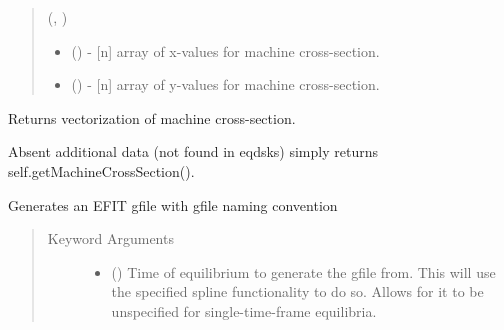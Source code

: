 \documentclass[letterpaper,10pt,english]{sphinxmanual}
\begin{document}
\begin{fulllineitems}
\begin{fulllineitems}
\begin{quote}
\begin{description}
(, )
\begin{itemize}
\item {} 
 () - {[}n{]} array of x-values for machine cross-section.

\item {} 
 () - {[}n{]} array of y-values for machine cross-section.

\end{itemize}


\end{description}\end{quote}

\end{fulllineitems}


\begin{fulllineitems}
\label{\detokenize{eqtools:eqtools.eqdskreader.EqdskReader.getMachineCrossSectionFull}}
Returns vectorization of machine cross-section.

Absent additional data (not found in eqdsks) simply returns
self.getMachineCrossSection().

\end{fulllineitems}


\begin{fulllineitems}
\label{\detokenize{eqtools:eqtools.eqdskreader.EqdskReader.gfile}}
Generates an EFIT gfile with gfile naming convention
\begin{quote}\begin{description}
\item[{Keyword Arguments}] \leavevmode\begin{itemize}
\item {} 
 () \textendash{} Time of equilibrium to
generate the gfile from. This will use the specified
spline functionality to do so. Allows for it to be
unspecified for single-time-frame equilibria.


\end{itemize}
\end{description}
\end{quote}
\end{fulllineitems}
\end{fulllineitems}
\end{document}
